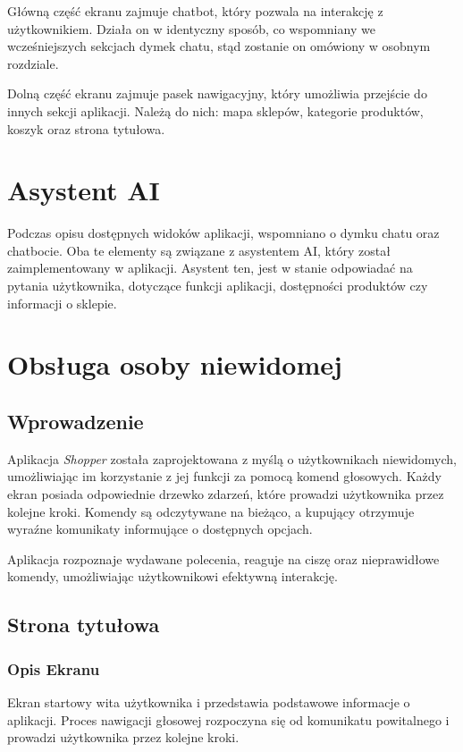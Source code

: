 Główną część ekranu zajmuje chatbot, który pozwala na interakcję z użytkownikiem. Działa on w identyczny sposób, co wspomniany we wcześniejszych sekcjach dymek chatu, stąd zostanie on omówiony w osobnym rozdziale.

Dolną część ekranu zajmuje pasek nawigacyjny, który umożliwia przejście do innych sekcji aplikacji. Należą do nich: mapa sklepów, kategorie produktów, koszyk oraz strona tytułowa.

\section{Asystent AI}

Podczas opisu dostępnych widoków aplikacji, wspomniano o dymku chatu oraz chatbocie. Oba te elementy są związane z asystentem AI, który został zaimplementowany w aplikacji. Asystent ten, jest w stanie odpowiadać na pytania użytkownika, dotyczące funkcji aplikacji, dostępności produktów czy informacji o sklepie.

\section{Obsługa osoby niewidomej}

\subsection{Wprowadzenie}

Aplikacja \textit{Shopper} została zaprojektowana z myślą o użytkownikach niewidomych, umożliwiając im  korzystanie z jej funkcji za pomocą komend głosowych. Każdy ekran posiada odpowiednie drzewko zdarzeń, które prowadzi użytkownika przez kolejne kroki. Komendy są odczytywane na bieżąco, a kupujący otrzymuje wyraźne komunikaty informujące o dostępnych opcjach.

Aplikacja rozpoznaje wydawane polecenia, reaguje na ciszę oraz nieprawidłowe komendy, umożliwiając użytkownikowi efektywną interakcję.

\subsection{Strona tytułowa}

\subsubsection{Opis Ekranu}
Ekran startowy wita użytkownika i przedstawia podstawowe informacje o aplikacji. Proces nawigacji głosowej rozpoczyna się od komunikatu powitalnego i prowadzi użytkownika przez kolejne kroki.

